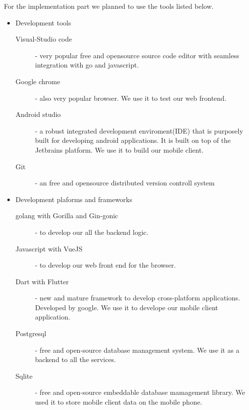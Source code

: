 For the implementation part we planned to use the tools listed below.
\begin{itemize}
	\item Development tools
	\begin{description}
		\item[Visual-Studio code] - very popular free and opensource source code editor with seamless integration with go and javascript.
		\item[Google chrome] - also very popular browser. We use it to test our web frontend.
		\item[Android studio] - a robust integrated development enviroment(IDE) that is purposely built for developing android applications. It is built on top of the Jetbrains platform. We use it to build our mobile client.
		\item[Git] - an free and opensource distributed version controll system
	\end{description}
	\item Development plaforms and frameworks
	\begin{description}
		\item[golang with Gorilla and Gin-gonic] - to develop our all the backend logic.
		\item[Javascript with VueJS] - to develop our web front end for the browser.
		\item[Dart with Flutter] - new and mature framework to develop cross-platform applications. Developed by google. We use it to develope our mobile client application.
		\item[Postgresql] - free and open-source database management system. We use it as a backend to all the services.
		\item[Sqlite] - free and open-source embeddable database mamagement library. We used it to store mobile client data on the mobile phone.
	\end{description}


\end{itemize}
